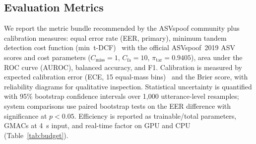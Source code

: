 \subsection{Evaluation Metrics}
\label{ssec:metrics}

We report the metric bundle recommended by the ASVspoof community plus
calibration measures: equal error rate (EER, primary), minimum tandem detection cost
function (min~t-DCF)~\cite{kinnunen2020tdcf} with the official ASVspoof~2019 ASV
scores and cost parameters ($C_{\text{miss}}{=}1$, $C_{\text{fa}}{=}10$,
$\pi_{\text{tar}}{=}0.9405$), area under the ROC curve (AUROC), balanced accuracy,
and F1. Calibration is measured by expected calibration error (ECE, 15 equal-mass
bins)~\cite{guo2017calibration} and the Brier score, with reliability diagrams for
qualitative inspection. Statistical uncertainty is quantified with 95\% bootstrap
confidence intervals over 1,000 utterance-level resamples; system comparisons use
paired bootstrap tests on the EER difference with significance at $p < 0.05$.
Efficiency is reported as trainable/total parameters, GMACs at 4~s input, and
real-time factor on GPU and CPU (Table~\ref{tab:budget}).
